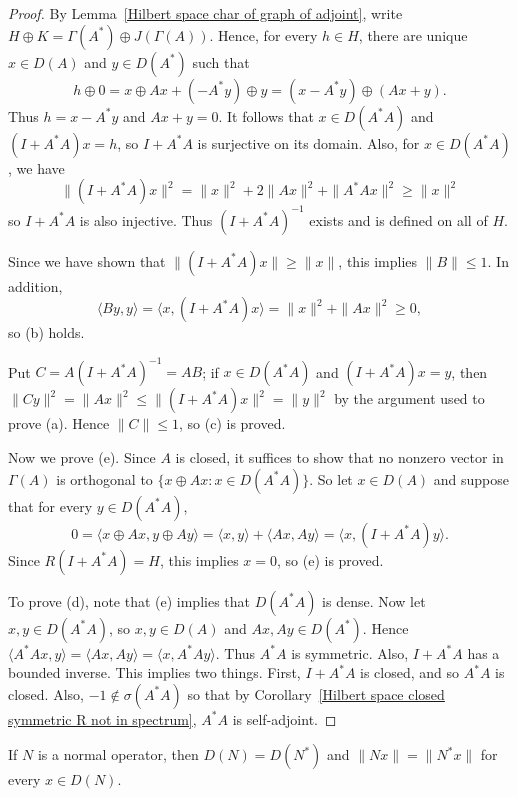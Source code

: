 \begin{proof}
By Lemma~\ref{Hilbert space char of graph of adjoint}, write $H\oplus K=\Gamma(A^*)\oplus J(\Gamma(A))$. Hence, for every $h\in H$, there are unique $x\in D(A)$ and $y\in D(A^*)$ such that
\[h\oplus 0=x\oplus Ax+(-A^*y)\oplus y=(x-A^*y)\oplus(Ax+y).\]
Thus $h=x-A^*y$ and $Ax+y=0$. It follows that $x\in D(A^*A)$ and $(I+A^*A)x=h$, so $I+A^*A$ is surjective on its domain. Also, for $x\in D(A^*A)$, we have
\[\|(I+A^*A)x\|^2=\|x\|^2+2\|Ax\|^2+\|A^*Ax\|^2\geq\|x\|^2\]
so $I+A^*A$ is also injective. Thus $(I+A^*A)^{-1}$ exists and is defined on all of $H$.\par
Since we have shown that $\|(I+A^*A)x\|\geq\|x\|$, this implies $\|B\|\leq 1$. In addition,
\[\langle By,y\rangle=\langle x,(I+A^*A)x\rangle=\|x\|^2+\|Ax\|^2\geq 0,\] so (b) holds.\par
Put $C=A(I+A^*A)^{-1}=AB$; if $x\in D(A^*A)$ and $(I+A^*A)x=y$, then $\|Cy\|^2=\|Ax\|^2\leq\|(I+A^*A)x\|^2=\|y\|^2$ by the argument used to prove (a). Hence $\|C\|\leq 1$, so (c) is proved.\par
Now we prove (e). Since $A$ is closed, it suffices to show that no nonzero vector in $\Gamma(A)$ is orthogonal to $\{x\oplus Ax:x\in D(A^*A)\}$. So let $x\in D(A)$ and suppose that for every $y\in D(A^*A)$,
\[0=\langle x\oplus Ax,y\oplus Ay\rangle=\langle x,y\rangle+\langle Ax,Ay\rangle=\langle x,(I+A^*A)y\rangle.\]
Since $R(I+A^*A)=H$, this implies $x=0$, so (e) is proved.\par
To prove (d), note that (e) implies that $D(A^*A)$ is dense. Now let $x,y\in D(A^*A)$, so $x,y\in D(A)$ and $Ax,Ay\in D(A^*)$. Hence $\langle A^*Ax,y\rangle=\langle Ax,Ay\rangle=\langle x,A^*Ay\rangle$. Thus $A^*A$ is symmetric. Also, $I+A^*A$ has a bounded inverse. This implies two things. First, $I+A^*A$ is closed, and so $A^*A$ is closed. Also, $-1\notin\sigma(A^*A)$ so that by Corollary~\ref{Hilbert space closed symmetric R not in spectrum}, $A^*A$ is self-adjoint.
\end{proof}
\begin{proposition}\label{Hilbert space normal unbounded operator domain of dual}
If $N$ is a normal operator, then $D(N)=D(N^*)$ and $\|Nx\|=\|N^*x\|$ for every $x\in D(N)$.
\end{proposition}
